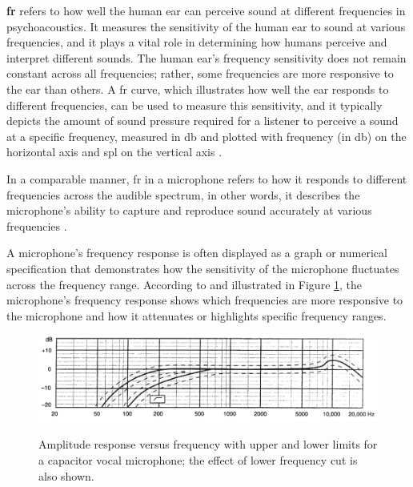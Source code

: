 \textbf{\gls{fr}} refers to how well the human ear can perceive sound at different frequencies in psychoacoustics. It measures the sensitivity of the human ear to sound at various frequencies, and it plays a vital role in determining how humans perceive and interpret different sounds. The human ear's frequency sensitivity does not remain constant across all frequencies; rather, some frequencies are more responsive to the ear than others. A \gls{fr} curve, which illustrates how well the ear responds to different frequencies, can be used to measure this sensitivity, and it typically depicts the amount of sound pressure required for a listener to perceive a sound at a specific frequency, measured in \gls{db} and plotted with frequency (in \gls{db}) on the horizontal axis and \gls{spl} on the vertical axis \cite{Moore2013}.

In a comparable manner, \gls{fr} in a microphone refers to how it responds to different frequencies across the audible spectrum, in other words, it describes the microphone's ability to capture and reproduce sound accurately at various frequencies \cite{Rayburn2004}.

A microphone's frequency response is often displayed as a graph or numerical specification that demonstrates how the sensitivity of the microphone fluctuates across the frequency range. According to \textcite{Rayburn2004} and illustrated in Figure \ref{fig:frmwk_microphone_frequency_response}, the microphone's frequency response shows which frequencies are more responsive to the microphone and how it attenuates or highlights specific frequency ranges.

\begin{figure}[htbp]
    \raggedright
        \caption{Amplitude response versus frequency with upper and lower limits for a capacitor vocal microphone; the effect of lower frequency cut is also shown.}
        \includegraphics[width=1\textwidth]{resources/images/030-theoretical_framework/Framework_microphone_frequency_response.png}
        \label{fig:frmwk_microphone_frequency_response}
\end{figure}

